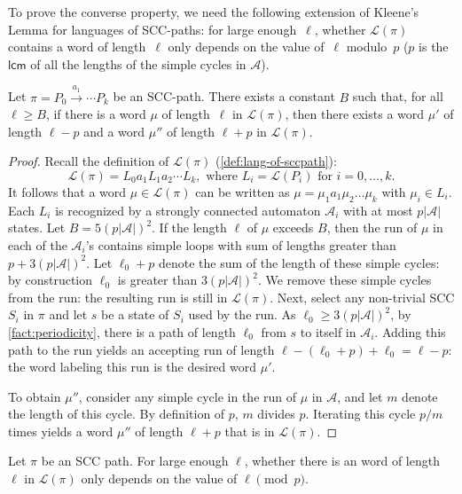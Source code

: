 \documentclass[letterpaper, USenglish, cleveref, autoref, thm-restate, numberwithinsect]{lipics-v2021}
\theoremstyle{theorem}
\theoremstyle{definition}
\newcommand{\Aa}{\mathcal{A}}
\newcommand{\lang}[1]{\mathcal{L}(#1)}
\newcommand{\lcm}{\mathsf{lcm}}
\newcommand{\SCCpath}{\pi}
\begin{document}
To prove the converse property, we need the following extension of Kleene's Lemma for languages of SCC-paths: for large enough~$\ell$, whether $\lang{\SCCpath}$ contains a word of length~$\ell$ only depends on the value of~$\ell$ modulo~$p$ ($p$ is the $\lcm$ of all the lengths of the simple cycles in $\Aa$).
\begin{lemma}
    Let $\SCCpath = P_0 \xrightarrow{a_1} \cdots P_k$ be an SCC-path.
    There exists a constant $B $ such that, for all $\ell \ge B$, if there is a word $\mu$ of length~$\ell$ in $\lang{\SCCpath}$,
    then there exists a word $\mu'$ of length  $\ell - p$  and a word $\mu''$ of length  $\ell + p$ in $\lang{\SCCpath}$.
\end{lemma}
\begin{proof}
    Recall the definition of $\lang{\SCCpath}$ (\cref{def:lang-of-sccpath}):
    \[\lang{\SCCpath} = L_0 a_1 L_1 a_2 \cdots L_k, \text{ where } L_i = \lang{P_i} \text { for } i =0,\ldots,k.\]
    It follows that a word $\mu\in \lang{\SCCpath}$ can be written as $\mu= \mu_1a_1\mu_2\ldots \mu_k$ with $\mu_i\in L_i$.
    Each $L_i$ is recognized by a strongly connected automaton $\Aa_i$ with at most $p|\Aa|$ states.
    Let $B = 5(p|\Aa|)^2$.
    If the length $\ell$ of $\mu$ exceeds $B$, then the run of $\mu$ in each of the $\Aa_i$'s contains simple loops with sum of lengths greater than $p+ 3(p|\Aa|)^2$. Let $\ell_0+p$ denote the sum of the length of these simple cycles: by construction $\ell_0$ is greater than $3(p|\Aa|)^2$.
    We remove these simple cycles from the run: the resulting run is still in $\lang{\SCCpath}$. Next, select any non-trivial SCC $S_i$ in $\SCCpath$ and let $s$ be a state of $S_i$ used by the run.
    As $\ell_0 \ge 3(p|\Aa|)^2$, by \cref{fact:periodicity}, there is a path of length $\ell_0$ from $s$ to itself in $\Aa_i$. Adding this path to the run yields an accepting run of length $\ell - (\ell_0 + p) +\ell_0 = \ell-p$: the word labeling this run is the desired word $\mu'$.
    
    To obtain $\mu''$, consider any simple cycle in the run of $\mu$ in $\Aa$, and let $m$ denote the length of this cycle.
    By definition of $p$, $m$ divides $p$. Iterating this cycle $p/m$ times yields a word $\mu''$ of length $\ell+p$ that is in $\lang{\SCCpath}$.
\end{proof}
\begin{corollary}\label{lem:fin-dist-iff-modulo}
    Let $\SCCpath$ be an SCC path.
    For large enough $\ell$, whether there is an word of length $\ell$ in $\lang{\SCCpath}$ only depends on the value of $\ell \pmod{p}$.
\end{corollary}
\end{document}
